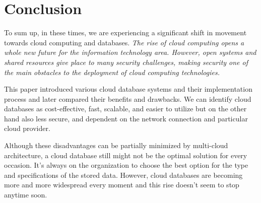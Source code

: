 \documentclass[12pt, a4paper]{article}
\begin{document}
\section{Conclusion}
    To sum up, in these times, we are experiencing a significant shift in movement towards cloud computing and databases. \textit{The rise of cloud computing opens a whole new future for the information technology area. However, open systems and shared resources give place to many security challenges, making security one of the main obstacles to the deployment of cloud computing technologies.}\cite{05}\par This paper introduced various cloud database systems and their implementation process and later compared their benefits and drawbacks. We can identify cloud databases as cost-effective, fast, scalable, and easier to utilize but on the other hand also less secure, and dependent on the network connection and particular cloud provider.\par Although these disadvantages can be partially minimized by multi-cloud architecture, a cloud database still might not be the optimal solution for every occasion. It's always on the organization to choose the best option for the type and specifications of the stored data. However, cloud databases are becoming more and more widespread every moment and this rise doesn't seem to stop anytime soon.
\clearpage



\end{document}
